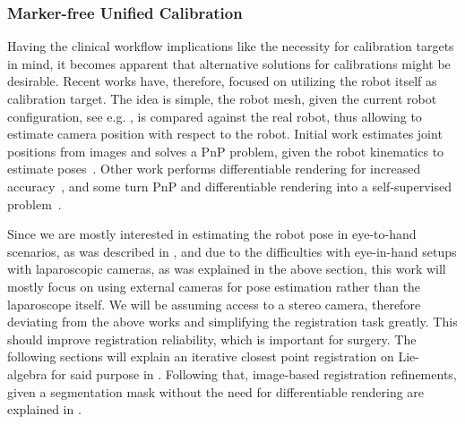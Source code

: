 \subsubsection{Marker-free Unified Calibration}
\label{in:sec:marker_free_unified_calibration}
Having the clinical workflow implications like the necessity for calibration targets in mind, it becomes apparent that alternative solutions for calibrations might be desirable. Recent works have, therefore, focused on utilizing the robot itself as calibration target. The idea is simple, the robot mesh, given the current robot configuration, see e.g. , is compared against the real robot, thus allowing to estimate camera position with respect to the robot. Initial work estimates joint positions from images and solves a PnP problem, given the robot kinematics to estimate poses~\cite{labbe2021single}. Other work performs differentiable rendering for increased accuracy~\cite{chen2023easy}, and some turn PnP and differentiable rendering into a self-supervised problem~\cite{lu2023markerless}.

Since we are mostly interested in estimating the robot pose in eye-to-hand scenarios, as was described in , and due to the difficulties with eye-in-hand setups with laparoscopic cameras, as was explained in the above section, this work will mostly focus on using external cameras for pose estimation rather than the laparoscope itself. We will be assuming access to a stereo camera, therefore deviating from the above works and simplifying the registration task greatly. This should improve registration reliability, which is important for surgery. The following sections will explain an iterative closest point registration on Lie-algebra for said purpose in . Following that, image-based registration refinements, given a segmentation mask without the need for differentiable rendering are explained in .



